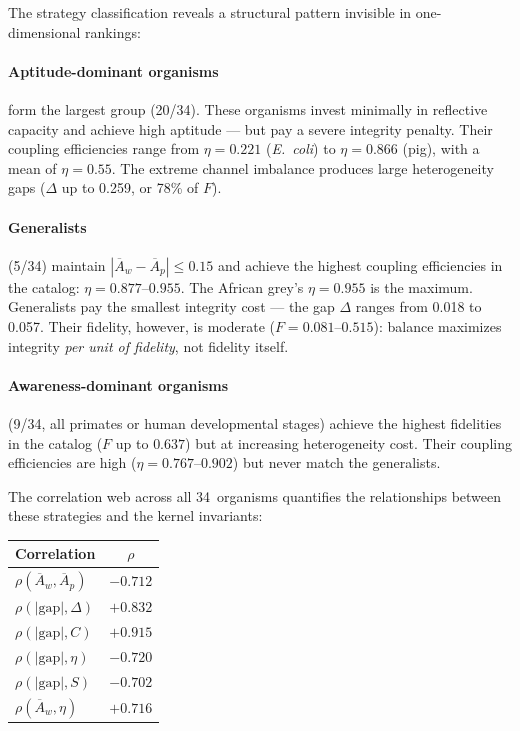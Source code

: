 \documentclass[
  aps,
  prd,
  twocolumn,
  superscriptaddress,
  nofootinbib,
  floatfix
]{revtex4-2}
\newcommand{\Aw}{\overline{A}_{\!w}}
\newcommand{\Ap}{\overline{A}_{\!p}}
\begin{document}
The strategy classification reveals a structural pattern
invisible in one-dimensional rankings:

\paragraph{Aptitude-dominant organisms} form the largest
group (20/34).  These organisms invest minimally in
reflective capacity and achieve high aptitude --- but pay
a severe integrity penalty.  Their coupling efficiencies
range from $\eta = 0.221$ (\textit{E.~coli}) to
$\eta = 0.866$ (pig), with a mean of $\eta = 0.55$.
The extreme channel imbalance produces large heterogeneity
gaps ($\Delta$ up to 0.259, or 78\% of $F$).

\paragraph{Generalists}  (5/34) maintain $|\Aw - \Ap| \leq 0.15$
and achieve the highest coupling efficiencies in the catalog:
$\eta = 0.877$--$0.955$.  The African grey's $\eta = 0.955$
is the maximum.  Generalists pay the smallest integrity cost
--- the gap $\Delta$ ranges from 0.018 to 0.057.  Their
fidelity, however, is moderate ($F = 0.081$--$0.515$):
balance maximizes integrity \emph{per unit of fidelity},
not fidelity itself.

\paragraph{Awareness-dominant organisms} (9/34, all primates
or human developmental stages) achieve the highest fidelities
in the catalog ($F$ up to $0.637$) but at increasing
heterogeneity cost.  Their coupling efficiencies are high
($\eta = 0.767$--$0.902$) but never match the generalists.

The correlation web across all 34~organisms quantifies the
relationships between these strategies and the kernel
invariants:

\begin{center}
\begin{tabular}{lc}
\toprule
Correlation & $\rho$ \\
\midrule
$\rho(\Aw, \Ap)$ & $-0.712$ \\
$\rho(|\mathrm{gap}|, \Delta)$ & $+0.832$ \\
$\rho(|\mathrm{gap}|, C)$ & $+0.915$ \\
$\rho(|\mathrm{gap}|, \eta)$ & $-0.720$ \\
$\rho(|\mathrm{gap}|, S)$ & $-0.702$ \\
$\rho(\Aw, \eta)$ & $+0.716$ \\
\bottomrule
\end{tabular}
\end{center}
\end{document}
